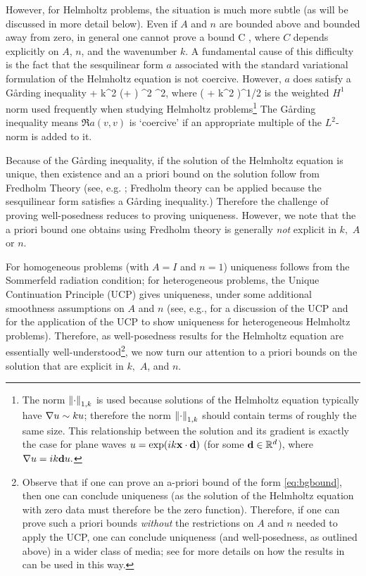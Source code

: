 However, for Helmholtz problems, the situation is much more subtle (as will be discussed in more detail below). Even if $A$ and $n$ are bounded above and bounded away from zero, in general one cannot prove a bound
\beq\label{eq:bgbound}
 \leq C ,
\eeq
where $C$ depends explicitly on $A$, $n$, and the wavenumber $k$. A fundamental cause of this difficulty is the fact that the sesquilinear form $a$ associated with the standard variational formulation of the Helmholtz equation is not coercive. However, $a$ does satisfy a G\r{a}rding inequality
\beq\label{eq:gardingbrief}
 + k^2 \mleft(\Amin + \nmax\mright) ^2 \geq \Amin {}^2,
\eeq
where
\beq\label{eq:weightednorm}
 \de \mleft( + k^2 \mright)^{1/2}
\eeq
is the weighted $H^1$ norm used frequently when studying Helmholtz problems\footnote{The norm $\NW{\cdot}$ is used because solutions of the Helmholtz equation typically  have $\nabla u \sim ku$; therefore the norm $\NW{\cdot}$ should contain terms of roughly the same size. This relationship between the solution and its gradient is exactly the case for plane waves $u = \exp(ik \mathbf{x} \cdot \mathbf{d})$ (for some $\mathbf{d} \in \mathbb R^{d}$), where $\nabla u = ik \mathbf{d} u.$} The G\r{a}rding inequality means $\Re{a(v,v)}$ is `coercive' if an appropriate multiple of the $L^2$-norm is added to it.

Because of the G\r{a}rding inequality, if the solution of the Helmholtz equation is unique, then existence and an a priori bound on the solution follow from Fredholm Theory (see, e.g. \cite[Theorems 5.10 and 5.18]{Sp:15}; Fredholm theory can be applied because the sesquilinear form satisfies a G\r{a}rding inequality.) Therefore the challenge of proving well-posedness reduces to proving uniqueness. However, we note that the a priori bound one obtains using Fredholm theory is generally \emph{not} explicit in $k,$ $A$ or $n$.

For homogeneous problems (with $A=I$ and $n=1$) uniqueness follows from the Sommerfeld radiation condition; for heterogeneous problems, the Unique Continuation Principle (UCP) gives uniqueness, under some additional smoothness assumptions on $A$ and $n$ (see, e.g., \cite[p. 2871]{GrPeSp:19} for a discussion of the UCP and \cite[Section 2]{GrSa:18} for the application of the UCP to show uniqueness for heterogeneous Helmholtz problems). Therefore, as well-posedness results for the Helmholtz equation are essentially well-understood\footnote{Observe that if one can prove an a-priori bound of the form \eqref{eq:bgbound}, then one can conclude uniqueness (as the solution of the Helmholtz equation with zero data must therefore be the zero function). Therefore, if one can prove such a priori bounds \emph{without} the restrictions on $A$ and $n$ needed to apply the UCP, one can conclude uniqueness (and well-posedness, as outlined above) in a wider class of media; see \cite[pp. 2873, 2883]{GrPeSp:19} for more details on how the results in \cite{GrPeSp:19} can be used in this way.}, we now turn our attention to a priori bounds on the solution that are explicit in $k,$ $A$, and $n.$

